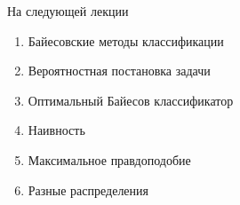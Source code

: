\documentclass[10pt]{beamer}
\begin{document}
\begin{frame}{На следующей лекции}
  	\begin{enumerate} [--]
		\item Байесовские методы классификации
		\item Вероятностная постановка задачи
		\item Оптимальный Байесов классификатор
		\item Наивность
		\item Максимальное правдоподобие
		\item Разные распределения
	\end{enumerate}
\end{frame}
\end{document}
